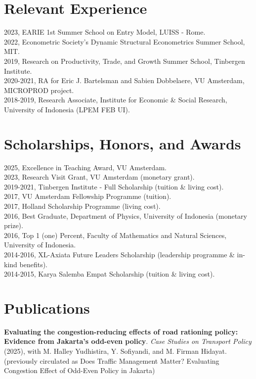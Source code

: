 \documentclass[10pt,letterpaper]{article}
\begin{document}
\section*{Relevant Experience}
2023, EARIE 1st Summer School on Entry Model, LUISS - Rome. \\
2022, Econometric Society's Dynamic Structural Econometrics Summer School, MIT. \\
2019, Research on Productivity, Trade, and Growth Summer School, Tinbergen Institute. \\
2020-2021, RA for Eric J. Bartelsman and Sabien Dobbelaere, VU Amsterdam, MICROPROD project. \\
2018-2019, Research Associate, Institute for Economic \& Social Research, University of Indonesia (LPEM FEB UI).
\section*{Scholarships, Honors, and Awards}
2025, Excellence in Teaching Award, VU Amsterdam. \\
2023, Research Visit Grant, VU Amsterdam (monetary grant). \\
2019-2021, Tinbergen Institute - Full Scholarship (tuition \& living cost). \\
2017, VU Amsterdam Fellowship Programme (tuition). \\
2017, Holland Scholarship Programme (living cost). \\
2016, Best Graduate, Department of Physics, University of Indonesia (monetary prize). \\
2016, Top 1 (one) Percent, Faculty of Mathematics and Natural Sciences, University of Indonesia. \\
2014-2016, XL-Axiata Future Leaders Scholarship (leadership programme \& in-kind benefits). \\
2014-2015, Karya Salemba Empat Scholarship (tuition \& living cost). 
\section*{Publications}
\textbf{Evaluating the congestion-reducing effects of road rationing policy: Evidence from Jakarta's odd-even policy}. \textit{Case Studies on Transport Policy} (2025), with M. Halley Yudhistira, Y. Sofiyandi, and M. Firman Hidayat. (previously circulated as Does Traffic Management Matter? Evaluating Congestion Effect of Odd-Even Policy in Jakarta)

\vspace{0.1in}
\end{document}
